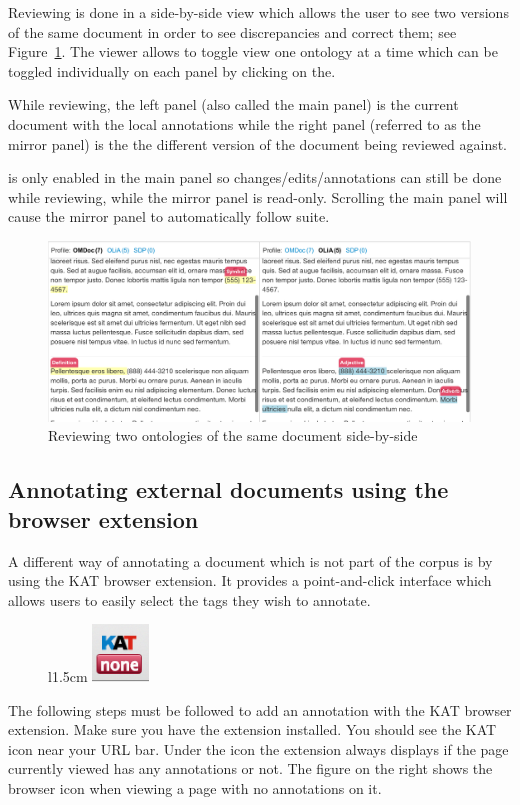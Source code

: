 Reviewing is done in a side-by-side view which allows the user to see two versions of the
same document in order to see discrepancies and correct them; see
Figure~\ref{fig:kat-review}. The viewer allows to toggle view one ontology at a time which
can be toggled individually on each panel by clicking on the.

While reviewing, the left panel (also called the main panel) is the current document with
the local annotations while the right panel (referred to as the mirror panel) is the the
different version of the document being reviewed against.

\KAT is only enabled in the main panel so changes/edits/annotations can still be done
while reviewing, while the mirror panel is read-only. Scrolling the main panel will cause
the mirror panel to automatically follow suite.

\begin{figure}[ht]\centering
 \includegraphics[width=5in]{../PIC/review}
 \caption{Reviewing two ontologies of the same document side-by-side}\label{fig:kat-review}
\end{figure}

\subsection{Annotating external documents using the browser extension}

A different way of annotating a document which is not part of the corpus is by
using the KAT browser extension. It provides a point-and-click interface which
allows users to easily select the tags they wish to annotate.


\begin{figure}l{1.5cm}\vspace*{-1em}
  \includegraphics[width=1.5cm]{../PIC/extension-browser-icon-none}
\end{figure}
The following steps must be followed to add an annotation with the KAT browser extension.
Make sure you have the extension installed. You should see the KAT icon near your URL bar.
Under the icon the extension always displays if the page currently viewed has any
annotations or not. The figure on the right shows the \KAT browser icon when viewing a
page with no annotations on it.

